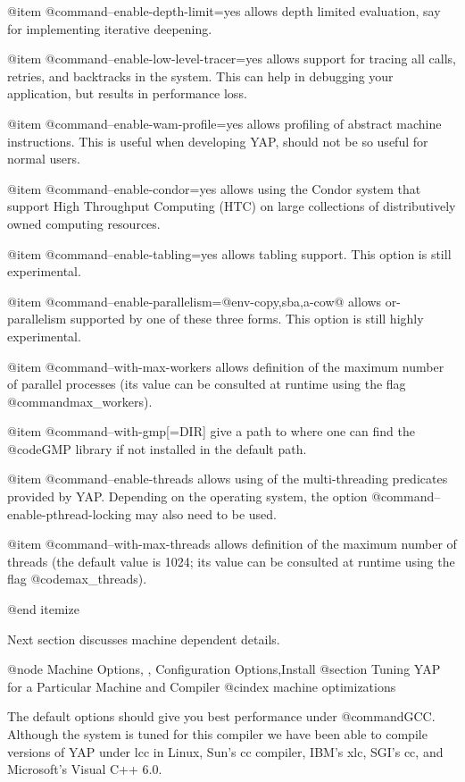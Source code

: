  @item @command{--enable-depth-limit=yes} allows depth limited evaluation, say for
implementing iterative deepening.

 @item @command{--enable-low-level-tracer=yes} allows support for tracing all calls,
retries, and backtracks in the system. This can help in debugging your
application, but results in performance loss.

 @item @command{--enable-wam-profile=yes} allows profiling of abstract machine
instructions. This is useful when developing YAP, should not be so
useful for normal users.

 @item @command{--enable-condor=yes} allows using the Condor system that
support High Throughput Computing (HTC) on large collections of
distributively owned computing resources.

 @item @command{--enable-tabling=yes} allows tabling support. This option
is still experimental.

 @item @command{--enable-parallelism=@{env-copy,sba,a-cow@}} allows
or-parallelism supported by one of these three forms. This option is
still highly experimental.

 @item @command{--with-max-workers} allows definition of the maximum 
number of parallel processes (its value can be consulted at runtime 
using the flag @command{max_workers}).

 @item @command{--with-gmp[=DIR]} give a path to where one can find the
@code{GMP} library if not installed in the default path.

 @item @command{--enable-threads} allows using of the multi-threading 
predicates provided by YAP. Depending on the operating system, the 
option @command{--enable-pthread-locking} may also need to be used.

 @item @command{--with-max-threads} allows definition of the maximum 
number of threads (the default value is 1024; its value can be consulted 
at runtime using the flag @code{max_threads}).

@end itemize

Next section discusses machine dependent details.

@node Machine Options, , Configuration Options,Install
@section Tuning YAP for a Particular Machine and Compiler
@cindex machine optimizations

The default options should give you best performance under
@command{GCC}. Although the system is tuned for this compiler
we have been able to compile versions of YAP under lcc in Linux,
Sun's cc compiler, IBM's xlc, SGI's cc, and Microsoft's Visual C++
6.0.

